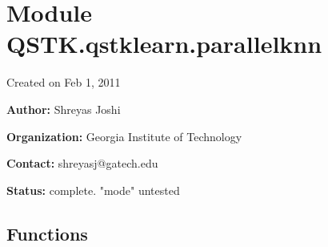 %
%
%


\section{Module QSTK.qstklearn.parallelknn}

    \label{QSTK:qstklearn:parallelknn}
Created on Feb 1, 2011

\textbf{Author:} Shreyas Joshi



\textbf{Organization:} Georgia Institute of Technology



\textbf{Contact:} shreyasj@gatech.edu



\textbf{Status:} complete. "mode" untested





  \subsection{Functions}

    \label{QSTK:qstklearn:parallelknn:par_query}

    \vspace{0.5ex}

